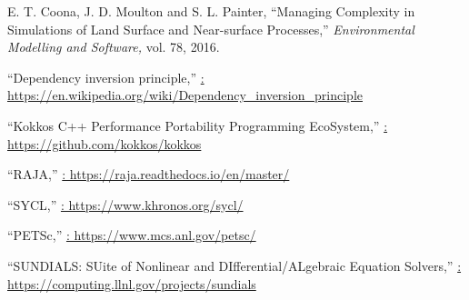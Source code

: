 \documentclass{article}
\begin{document}
\begin{thebibliography}{1}
E. T. Coona, J. D. Moulton and S. L. Painter,
``Managing Complexity in Simulations of Land Surface and Near-surface Processes,''
\textit{Environmental Modelling and Software, }vol. 78, 2016. 

``Dependency inversion principle,'' 
\newblock \url{: https://en.wikipedia.org/wiki/Dependency\_inversion\_principle}

``Kokkos C++ Performance Portability Programming EcoSystem,'' 
\newblock \url{: https://github.com/kokkos/kokkos}

``RAJA,'' 
\newblock \url{: https://raja.readthedocs.io/en/master/}

``SYCL,'' 
\newblock \url{: https://www.khronos.org/sycl/}

``PETSc,'' 
\newblock \url{: https://www.mcs.anl.gov/petsc/}

``SUNDIALS: SUite of Nonlinear and DIfferential/ALgebraic Equation Solvers,''
\newblock \url{: https://computing.llnl.gov/projects/sundials}

\end{thebibliography}
\end{document}
